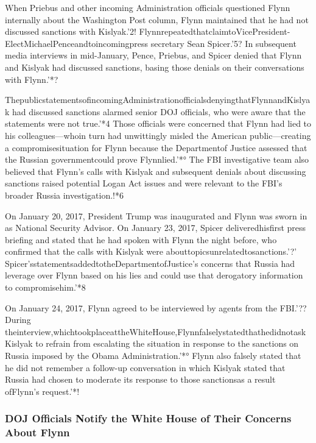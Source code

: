 When Priebus and other incoming Administration officials questioned Flynn internally about the Washington Post column, Flynn maintained that he had not discussed sanctions with Kislyak.'2!
FlynnrepeatedthatclaimtoVicePresident-ElectMichaelPenceandtoincomingpress secretary Sean Spicer.'5?
In subsequent media interviews in mid-January, Pence, Priebus, and Spicer denied that Flynn and Kislyak had discussed sanctions, basing those denials on their conversations with Flynn.'*?

ThepublicstatementsofincomingAdministrationofficialsdenyingthatFlynnandKislyak had discussed sanctions alarmed senior DOJ officials, who were aware that the statements were not true.'*4
Those officials were concerned that Flynn had lied to his colleagues—whoin turn had unwittingly misled the American public—creating a compromisesituation for Flynn because the Departmentof Justice assessed that the Russian governmentcould prove Flynnlied.'*°
The FBI investigative team also believed that Flynn’s calls with Kislyak and subsequent denials about discussing sanctions raised potential Logan Act issues and were relevant to the FBI’s broader Russia investigation.!*6

On January 20, 2017, President Trump was inaugurated and Flynn was sworn in as National Security Advisor.
On January 23, 2017, Spicer deliveredhisfirst press briefing and stated that he had spoken with Flynn the night before, who confirmed that the calls with Kislyak were abouttopicsunrelatedtosanctions.'?’
Spicer’sstatementsaddedtotheDepartmentofJustice’s concerns that Russia had leverage over Flynn based on his lies and could use that derogatory
information to compromisehim.'*8

On January 24, 2017, Flynn agreed to be interviewed by agents from the FBI.'??
During theinterview,whichtookplaceattheWhiteHouse,FlynnfalselystatedthathedidnotaskKislyak to refrain from escalating the situation in response to the sanctions on Russia imposed by the Obama Administration.'*°
Flynn also falsely stated that he did not remember a follow-up conversation in which Kislyak stated that Russia had chosen to moderate its response to those sanctionsas a result ofFlynn’s request.'*!

\subsubsection{DOJ Officials Notify the White House of Their Concerns About Flynn}

